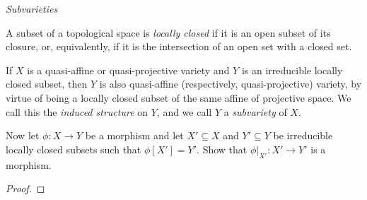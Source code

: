 \label{1.3.10}

\emph{Subvarieties}

A subset of a topological space is \emph{locally closed} if it is an open subset of its closure, or, equivalently, if it is the intersection of an open set with a closed set.

If $X$ is a quasi-affine or quasi-projective variety and $Y$ is an irreducible locally closed subset, then $Y$ is also quasi-affine (respectively, quasi-projective) variety, by virtue of being a locally closed subset of the same affine of projective space. We call this the \emph{induced structure} on $Y$, and we call $Y$ a \emph{subvariety} of $X$.

Now let $\phi: X \longrightarrow Y$ be a morphism and let $X' \subseteq X$ and $Y' \subseteq Y$ be irreducible locally closed subsets such that $\phi[X'] = Y'$. Show that $\phi|_{X'}: X' \longrightarrow Y'$ is a morphism.

\begin{proof}

\end{proof}
